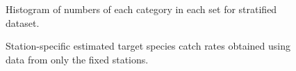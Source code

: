 \documentclass[12pt]{article}\usepackage[]{graphicx}\usepackage[]{color}
\begin{document}
\begin{appendices}
\begin{figure}[htb]
{}

\caption{Histogram of numbers of each category in each set for stratified dataset.}\label{fig:num-strat}
\end{figure}
\begin{figure}[htb]

{\centering {} 

}

\caption{Station-specific estimated target species catch rates obtained using data from only the fixed stations.}\label{fig:target-spat-fixed}
\end{figure}
\begin{figure}[htb]


\end{figure}
\end{appendices}
\end{document}
